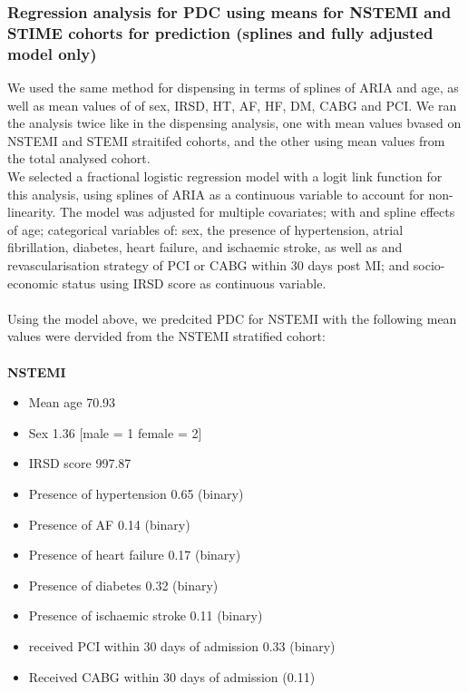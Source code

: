 \documentclass[11pt]{article}
\begin{document}
\subsubsection{Regression analysis for PDC using means for NSTEMI and STIME cohorts for prediction (splines and fully adjusted model only)}
We used the same method for dispensing in terms of splines of ARIA and age, as well as mean values of of sex, IRSD, HT, AF, HF, DM, CABG and PCI. We ran the analysis twice like in the dispensing analysis, one with mean values bvased on NSTEMI and STEMI straitifed cohorts, and the other using mean values from the total analysed cohort. \\
We selected a fractional logistic regression model with a logit link function for this analysis, using splines of ARIA as a continuous variable to account for non-linearity. The model was adjusted for multiple covariates; with and spline effects of age; categorical variables of: sex, the presence of hypertension, atrial fibrillation, diabetes, heart failure, and ischaemic stroke, as well as and revascularisation strategy of PCI or CABG within 30 days post MI; and socio-economic status using IRSD score as continuous variable. \\~\\

Using the model above, we predcited PDC for NSTEMI with the following mean values were dervided from the NSTEMI stratified cohort: \\~\\
\textbf{NSTEMI}
\begin{itemize}
\item Mean age 70.93
\item Sex 1.36 [male = 1 female = 2]
\item IRSD score 997.87
\item Presence of hypertension 0.65 (binary)
\item Presence of AF 0.14 (binary)
\item Presence of heart failure 0.17 (binary)
\item Presence of diabetes 0.32 (binary)
\item Presence of ischaemic stroke 0.11 (binary)
\item received PCI within 30 days of admission 0.33 (binary)
\item Received CABG within 30 days of admission (0.11)
\end{itemize}
\end{document}
